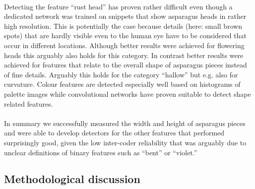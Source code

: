 \\
Detecting the feature “rust head” has proven rather difficult even though a dedicated network was trained on snippets that show asparagus heads in rather high resolution. This is potentially the case because details (here: small brown spots) that are hardly visible even to the human eye have to be considered that occur in different locations. Although better results were achieved for flowering heads this arguably also holds for this category. In contrast better results were achieved for features that relate to the overall shape of asparagus pieces  instead of fine details. Arguably this holds for the category “hallow” but e.g. also for curvature. Colour features are detected especially well based on histograms of palette images while convolutional networks have proven suitable to detect shape related features.\\
\\
In summary we successfully measured the width and height of asparagus pieces and were able to develop detectors for the other features that performed surprisingly good, given the low inter-coder reliability that was arguably due to unclear definitions of binary features such as “bent” or “violet.” 



\subsection{Methodological discussion}

